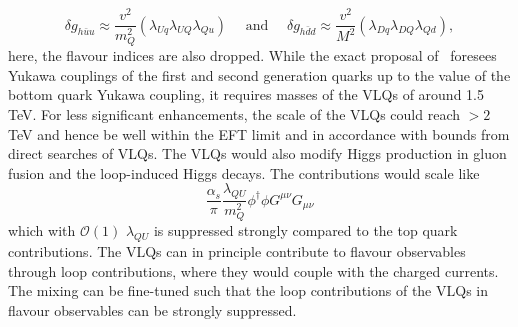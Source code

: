 \begin{equation}
	\delta g_{h\bar{u}u} \approx \frac{v^2}{m_{Q}^2} (\lambda_{Uq} \lambda_{UQ} \lambda_{Qu}) \quad \text{ and }   \quad  \delta g_{h\bar{d}d} \approx \frac{v^2}{M^2} (\lambda_{Dq} \lambda_{DQ} \lambda_{Qd}),
\end{equation}
here, the flavour indices are also dropped.
While the exact proposal of~\cite{Bar-Shalom:2018rjs} foresees Yukawa couplings of the first and second generation quarks up to the value of the bottom quark Yukawa coupling, it requires masses of the VLQs of around 1.5 TeV. For less significant enhancements, the scale of the VLQs could reach $>2$ TeV and hence be well within the EFT limit and in accordance with bounds from direct searches of VLQs. The VLQs would also modify Higgs production in gluon fusion and the loop-induced Higgs decays. The contributions would scale like
\begin{equation}
	\frac{\alpha_s}{\pi}\frac{\lambda_{QU}}{m_Q^2}  \phi^{\dagger}\phi G^{\mu\nu} G_{\mu\nu} 
\end{equation}
which with $\mathcal{O}(1)$ $\lambda_{QU}$ is suppressed strongly compared to the top quark contributions.
The VLQs can in principle contribute to flavour observables through loop contributions, where they would couple with the charged currents. The mixing can be fine-tuned such that the loop contributions of the VLQs in flavour observables can be strongly suppressed.


